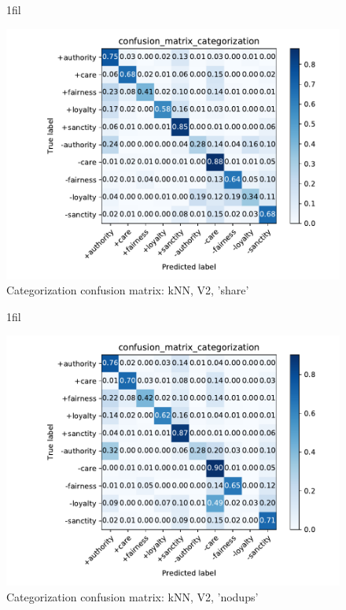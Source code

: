 \documentclass{article}
\makeatletter
\newcommand*{\centerfloat}{%
  \parindent \z@
  \leftskip \z@ \@plus 1fil \@minus \textwidth
  \rightskip\leftskip
  \parfillskip \z@skip}
\makeatother
\begin{document}
\begin{figure}[H]
    \centerfloat
    \caption{Categorization confusion matrix: kNN, V2, 'share'}
    \includegraphics[width=1.3\linewidth]{../../plots-2/confusion-matrix-knn-v2-share/confusion_matrix_categorization.pdf}
\end{figure}

\begin{figure}[H]
    \centerfloat
    \caption{Categorization confusion matrix: kNN, V2, 'nodups'}
    \includegraphics[width=1.3\linewidth]{../../plots-2/confusion-matrix-knn-v2-nodups/confusion_matrix_categorization.pdf}
\end{figure}
\end{document}
